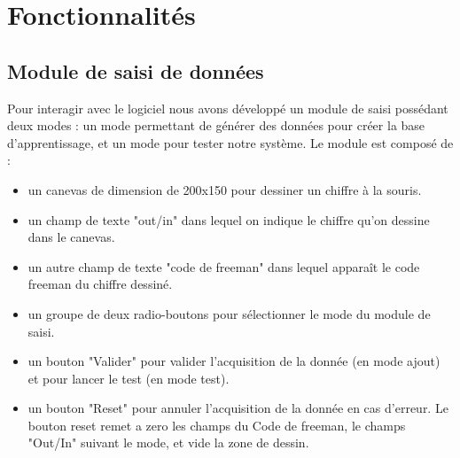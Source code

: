 \documentclass[10pt,a4paper]{report}
\begin{document}

\section{Fonctionnalités}

\subsection{Module de saisi de données}
\begin{flushleft}
Pour interagir avec le logiciel nous avons développé un module de saisi possédant deux modes : un mode permettant de générer des données pour créer la base d'apprentissage, et un mode pour tester notre système.\newline \newline
Le module est composé de :

\begin{itemize}[label=$-$,leftmargin=*,parsep=0cm,itemsep=0.1cm,topsep=0cm]
\item un canevas de dimension de 200x150 pour dessiner un chiffre à la souris.

\item un champ de texte "out/in" dans lequel on indique le chiffre qu'on dessine dans le canevas.

\item un autre champ de texte "code de freeman" dans lequel apparaît le code freeman du chiffre dessiné.

\item un groupe de deux radio-boutons pour sélectionner le mode du module de saisi.

\item un bouton "Valider" pour valider l'acquisition de la donnée (en mode ajout) et pour lancer le test (en mode test).
\item un bouton "Reset" pour annuler l'acquisition de la donnée en cas d'erreur. Le bouton reset remet a zero les champs du Code de freeman, le champs "Out/In" suivant le mode, et vide la zone de dessin.
\end{itemize}

\end{flushleft}
\end{document}
